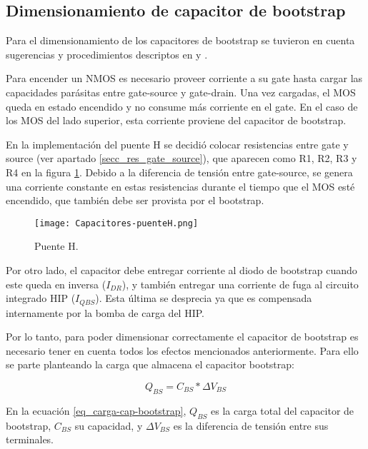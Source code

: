 \subsection{Dimensionamiento de capacitor de bootstrap}

\noindent Para el dimensionamiento de los capacitores de bootstrap se tuvieron en cuenta sugerencias y procedimientos descriptos en \cite{HIP4081A_AN9405} y \cite{HIP4081A_FN3659}.

\noindent Para encender un NMOS es necesario proveer corriente a su gate hasta cargar las capacidades parásitas entre gate-source y gate-drain. Una vez cargadas, el MOS queda en estado encendido y no consume más corriente en el gate. En el caso de los MOS del lado superior, esta corriente proviene del capacitor de bootstrap. 

\noindent En la implementación del puente H se decidió colocar resistencias entre gate y source (ver apartado \ref{secc_res_gate_source}), que aparecen como R1, R2, R3 y R4 en la figura \ref{fig:img_capacitores-puenteH}. Debido a la diferencia de tensión entre gate-source, se genera una corriente constante en estas resistencias durante el tiempo que el MOS esté encendido, que también debe ser provista por el  bootstrap.

\begin{figure}[H]
	\centering
	\texttt{[image: Capacitores-puenteH.png]}
	\caption{Puente H.}
	\label{fig:img_capacitores-puenteH}
\end{figure}

\noindent Por otro lado, el capacitor debe entregar corriente al diodo de bootstrap cuando este queda en inversa ($I_{DR}$), y también entregar una corriente de fuga al circuito integrado HIP ($I_{QBS}$). Esta última se desprecia ya que es compensada internamente por la bomba de carga del HIP.

\noindent Por lo tanto, para poder dimensionar correctamente el capacitor de bootstrap es necesario tener en cuenta todos los efectos mencionados anteriormente. Para ello se parte planteando la carga que almacena el capacitor bootstrap:

\begin{equation} \label{eq_carga-cap-bootstrap}
Q_{BS}=C_{BS}*\Delta V_{BS}
\end{equation}

\noindent En la ecuación \ref{eq_carga-cap-bootstrap}, $Q_{BS}$ es la carga total del capacitor de bootstrap, $C_{BS}$ su capacidad, y $\Delta V_{BS}$ es la diferencia de  tensión entre sus terminales. 

